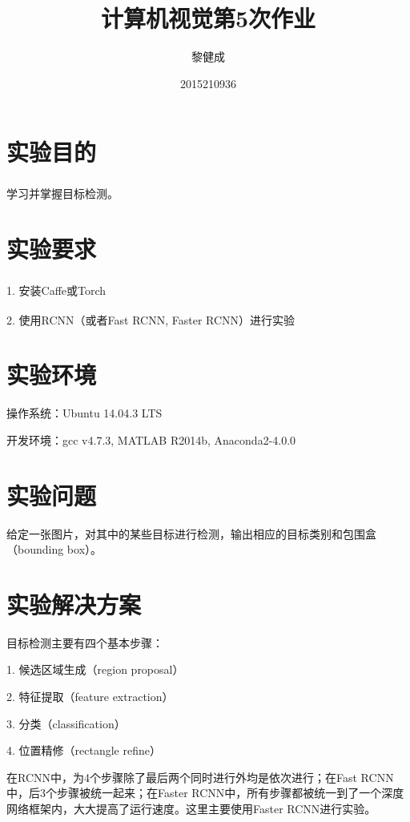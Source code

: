 \documentclass[a4paper, 12pt, UTF8]{article}
\begin{document}
\title{计算机视觉第5次作业}
\author{黎健成}
\date{2015210936}
\maketitle

\section{实验目的}

学习并掌握目标检测\textsuperscript{\cite{ref1}}。


\section{实验要求}

1. 安装Caffe\textsuperscript{\cite{ref2}}或Torch\textsuperscript{\cite{ref3}}

2. 使用RCNN\textsuperscript{\cite{ref4}}（或者Fast RCNN\textsuperscript{\cite{ref5}}, Faster RCNN\textsuperscript{\cite{ref6}}）进行实验

\section{实验环境}

操作系统：Ubuntu 14.04.3 LTS

开发环境：gcc v4.7.3, MATLAB R2014b, Anaconda2-4.0.0


\section{实验问题}

给定一张图片，对其中的某些目标进行检测，输出相应的目标类别和包围盒（bounding box）。


\section{实验解决方案}

目标检测主要有四个基本步骤：

1. 候选区域生成（region proposal）

2. 特征提取（feature extraction）

3. 分类（classification）

4. 位置精修（rectangle refine）

在RCNN中，为4个步骤除了最后两个同时进行外均是依次进行；在Fast RCNN中，后3个步骤被统一起来；在Faster RCNN中，所有步骤都被统一到了一个深度网络框架内，大大提高了运行速度。这里主要使用Faster RCNN进行实验。
\end{document}

